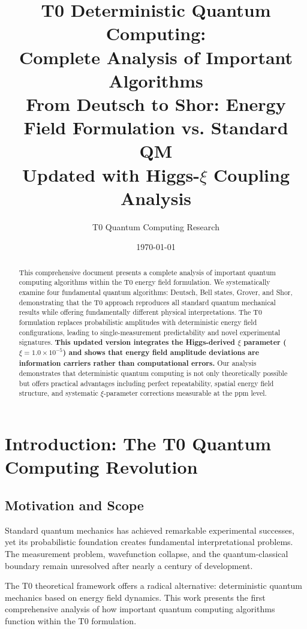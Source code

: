 \documentclass[12pt,a4paper]{article}
\title{T0 Deterministic Quantum Computing: \\
	Complete Analysis of Important Algorithms \\
	\large From Deutsch to Shor: Energy Field Formulation vs. Standard QM \\
	\textbf{Updated with Higgs-$\xi$ Coupling Analysis}}
\author{T0 Quantum Computing Research}
\date{\today}
\begin{document}
	
	\maketitle
	
	\begin{abstract}
		This comprehensive document presents a complete analysis of important quantum computing algorithms within the T0 energy field formulation. We systematically examine four fundamental quantum algorithms: Deutsch, Bell states, Grover, and Shor, demonstrating that the T0 approach reproduces all standard quantum mechanical results while offering fundamentally different physical interpretations. The T0 formulation replaces probabilistic amplitudes with deterministic energy field configurations, leading to single-measurement predictability and novel experimental signatures. \textbf{This updated version integrates the Higgs-derived $\xi$ parameter ($\xi = 1.0 \times 10^{-5}$) and shows that energy field amplitude deviations are information carriers rather than computational errors.} Our analysis demonstrates that deterministic quantum computing is not only theoretically possible but offers practical advantages including perfect repeatability, spatial energy field structure, and systematic $\xi$-parameter corrections measurable at the ppm level.
	\end{abstract}
	
	\tableofcontents
	\newpage
	
	\section{Introduction: The T0 Quantum Computing Revolution}
	
	\subsection{Motivation and Scope}
	
	Standard quantum mechanics has achieved remarkable experimental successes, yet its probabilistic foundation creates fundamental interpretational problems. The measurement problem, wavefunction collapse, and the quantum-classical boundary remain unresolved after nearly a century of development.
	
	The T0 theoretical framework offers a radical alternative: deterministic quantum mechanics based on energy field dynamics. This work presents the first comprehensive analysis of how important quantum computing algorithms function within the T0 formulation.
	
\end{document}
